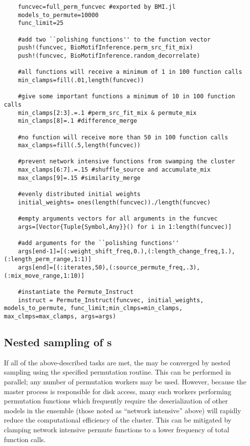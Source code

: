 \begin{verbatim}
    funcvec=full_perm_funcvec #exported by BMI.jl
    models_to_permute=10000
    func_limit=25
    
    #add two ``polishing functions'' to the function vector
    push!(funcvec, BioMotifInference.perm_src_fit_mix) 
    push!(funcvec, BioMotifInference.random_decorrelate)
    
    #all functions will receive a minimum of 1 in 100 function calls
    min_clamps=fill(.01,length(funcvec))

    #give some important functions a minimum of 10 in 100 function calls
    min_clamps[2:3].=.1 #perm_src_fit_mix & permute_mix
    min_clamps[8]=.1 #difference_merge

    #no function will receive more than 50 in 100 function calls
    max_clamps=fill(.5,length(funcvec))

    #prevent network intensive functions from swamping the cluster
    max_clamps[6:7].=.15 #shuffle_source and accumulate_mix
    max_clamps[9]=.15 #similarity_merge
    
    #evenly distributed initial weights
    initial_weights= ones(length(funcvec))./length(funcvec)
    
    #empty arguments vectors for all arguments in the funcvec
    args=[Vector{Tuple{Symbol,Any}}() for i in 1:length(funcvec)]
    
    #add arguments for the ``polishing functions''
    args[end-1]=[(:weight_shift_freq,0.),(:length_change_freq,1.),(:length_perm_range,1:1)]
    args[end]=[(:iterates,50),(:source_permute_freq,.3),(:mix_move_range,1:10)]
    
    #instantiate the Permute_Instruct
    instruct = Permute_Instruct(funcvec, initial_weights, models_to_permute, func_limit;min_clmps=min_clamps, max_clmps=max_clamps, args=args)
\end{verbatim}

\subsection{Nested sampling of \protect{}s}

If all of the above-described tasks are met, the  may be converged by nested sampling using the specified permutation routine. This can be performed in parallel; any number of permutation workers may be used. However, because the master process is responsible for disk access, many such workers performing permutation functions which frequently require the deserialization of other models in the ensemble (those noted as ``network intensive'' above) will rapidly reduce the computational efficiency of the cluster. This can be mitigated by clamping network intensive permute functions to a lower frequency of total function calls.

